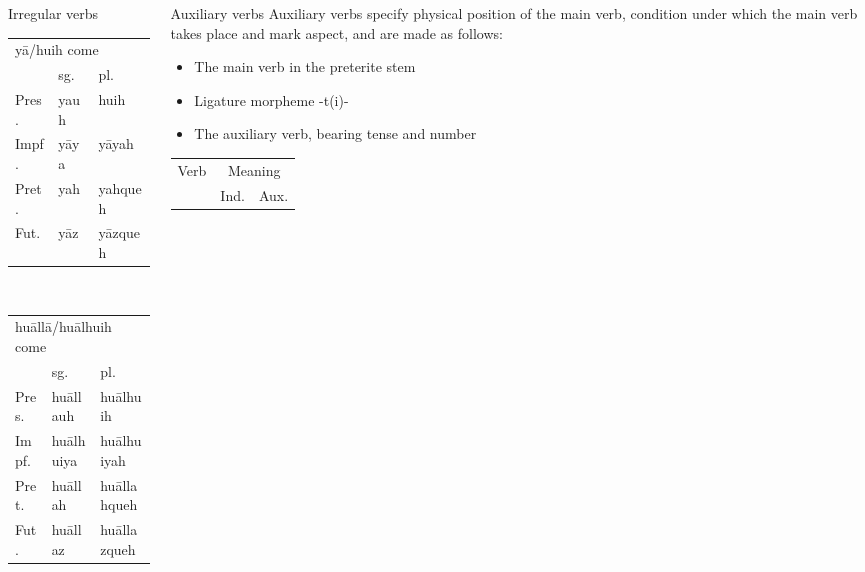 \documentclass[12pt]{beamer}
\newcommand{\nah}[1]{\textcolor{nahgrn}{#1}}
\newcommand{\trs}[1]{\textcolor{nahblu}{#1}}
\begin{document}
\begin{frame}
\begin{columns}[t]
\begin{column}{.18\linewidth}
\begin{block}{Irregular verbs}
\begin{tabular}[t]{lll}
          \multicolumn{3}{l}{\nah{yā/huih} \trs{come}} \\
                & sg.        & pl.                     \\
          Pres. & \nah{yauh} & \nah{huih}              \\
          Impf. & \nah{yāya} & \nah{yāyah}             \\
          Pret. & \nah{yah}  & \nah{yahqueh}           \\
          Fut.  & \nah{yāz}  & \nah{yāzqueh}           \\
        \end{tabular}%
        \\[1ex]
        \begin{tabular}[t]{lll}
          \multicolumn{3}{l}{\nah{huāllā/huālhuih} \trs{come}} \\
                & sg.             & pl.                        \\
          Pres. & \nah{huāllauh}  & \nah{huālhuih}             \\
          Impf. & \nah{huālhuiya} & \nah{huālhuiyah}           \\
          Pret. & \nah{huāllah}   & \nah{huāllahqueh}          \\
          Fut.  & \nah{huāllaz}   & \nah{huāllazqueh}          \\
        \end{tabular}%
      \end{block}
    \end{column}
    \begin{column}{.18\linewidth}
      \begin{block}{Auxiliary verbs}
        Auxiliary verbs specify physical position of the main verb, condition under which the main verb takes place and mark aspect, and are made as follows:
        \begin{itemize}
          \item The main verb in the preterite stem
          \item Ligature morpheme \nah{-t(i)-}
          \item The auxiliary verb, bearing tense and number
        \end{itemize}
        \begin{threeparttable}
          \begin{tabular}{lll}
            \multicolumn{1}{c}{Verb} & \multicolumn{2}{c}{Meaning}                            \\
                                     & \multicolumn{1}{c}{Ind.}    & \multicolumn{1}{c}{Aux.} \\

\end{tabular}
\end{threeparttable}
\end{block}
\end{column}
\end{columns}
\end{frame}
\end{document}
